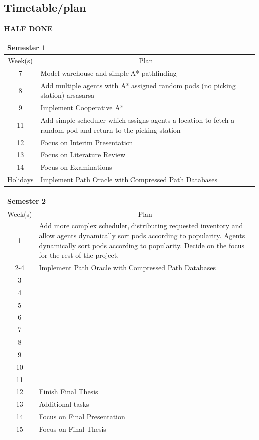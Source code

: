 \documentclass[a4paper,11pt]{article}
\begin{document}
\subsection{Timetable/plan}
\textbf{HALF DONE}
\begin{center}
{\footnotesize
\begin{tabular}{ c p{12cm} }
\multicolumn{2}{l}{\textbf{Semester 1}} \\
\hline \multicolumn{1}{c}{Week(s)} & \multicolumn{1}{c}{Plan} \\
\hline 7  & Model warehouse and simple A* pathfinding \\
\hline 8  & Add multiple agents with A* assigned random pods (no picking station) arsasarsa\\
\hline 9  & Implement Cooperative A* \\
\hline 11 & Add simple scheduler which assigns agents a location to fetch a random pod and return to the picking station \\
\hline 12 & Focus on Interim Presentation \\
\hline 13 & Focus on Literature Review \\
\hline 14 & Focus on Examinations \\
\hline Holidays & Implement Path Oracle with Compressed Path Databases \\
\hline
\end{tabular}
}


{\footnotesize
\vspace{0.5cm}
\begin{tabular}{ c p{12cm} }
\multicolumn{2}{l}{\textbf{Semester 2}} \\
\hline \multicolumn{1}{c}{Week(s)} & \multicolumn{1}{c}{Plan} \\
\hline 1  & Add more complex scheduler, distributing requested inventory  and allow agents dynamically sort pods according to popularity. Agents dynamically sort pods according to popularity. Decide on the focus for the rest of the project. \\
\hline 2-4 & Implement Path Oracle with Compressed Path Databases \\
\hline 3  &  \\
\hline 4  & \\
\hline 5  &   \\
\hline 6  &  \\
\hline 7  & \\
\hline 8  & \\
\hline 9  & \\
\hline 10 & \\
\hline 11 & \\
\hline 12 & Finish Final Thesis \\
\hline 13 & Additional tasks \\
\hline 14 & Focus on Final Presentation \\
\hline 15 & Focus on Final Thesis \\
\hline
\end{tabular}
}
\end{center}
\end{document}
